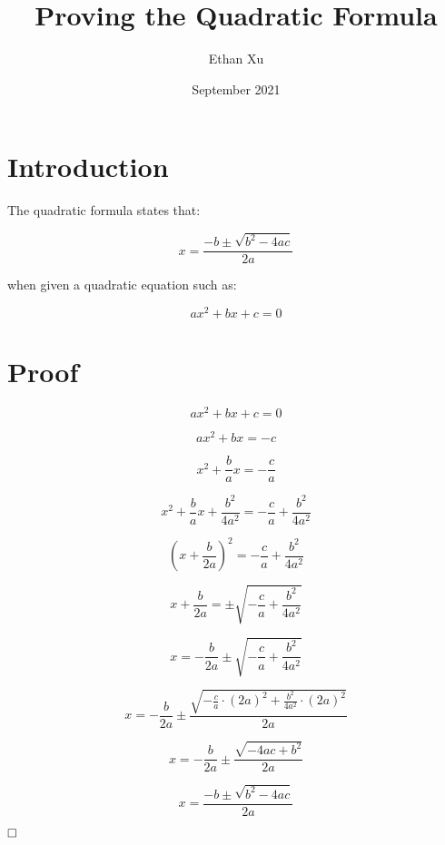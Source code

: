 \documentclass{article}
\title{Proving the Quadratic Formula}
\author{Ethan Xu}
\date{September 2021}
\renewcommand{\qed}{\hfill\square}
\begin{document}
\maketitle

\section{Introduction}

The quadratic formula states that:

\begin{equation}
    x=\frac{-b\pm\sqrt{b^2-4ac}}{2a}
\end{equation}

when given a quadratic equation such as:

\begin{equation}
    ax^2+bx+c=0
\end{equation}

\section{Proof}

\begin{equation}
    ax^2+bx+c=0
\end{equation}

\begin{equation}
    ax^2+bx=-c
\end{equation}

\begin{equation}
    x^2+\frac{b}{a}x=-\frac{c}{a}
\end{equation}

\begin{equation}
    x^2+\frac{b}{a}x+\frac{b^2}{4a^2}=-\frac{c}{a}+\frac{b^2}{4a^2}
\end{equation}

\begin{equation}
    (x+\frac{b}{2a})^2=-\frac{c}{a}+\frac{b^2}{4a^2}
\end{equation}

\begin{equation}
    x+\frac{b}{2a}=\pm\sqrt{-\frac{c}{a}+\frac{b^2}{4a^2}}
\end{equation}

\begin{equation}
    x=-\frac{b}{2a}\pm\sqrt{-\frac{c}{a}+\frac{b^2}{4a^2}}
\end{equation}

\begin{equation}
    x=-\frac{b}{2a}\pm\frac{\sqrt{-\frac{c}{a}\cdot(2a)^2+\frac{b^2}{4a^2}\cdot(2a)^2}}{2a}
\end{equation}

\begin{equation}
    x=-\frac{b}{2a}\pm\frac{\sqrt{-4ac+b^2}}{2a}
\end{equation}

\begin{equation}
    x=\frac{-b\pm\sqrt{b^2-4ac}}{2a}
\end{equation}

$\qed$
\end{document}
